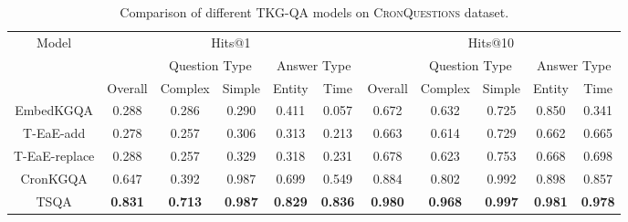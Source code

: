 \documentclass[11pt]{article}
\begin{document}
\begin{table*}[!ht]
    \centering
    \small
    \begin{tabular}{c||c|c|c|c|c||c|c|c|c|c}
      \hline
      \multirow{3}{4em}{Model}  &  \multicolumn{5}{c||}{Hits@1} &  \multicolumn{5}{c}{Hits@10}  \\ 
      \cline{2-11}
       &  & \multicolumn{2}{c|}{Question Type}& \multicolumn{2}{c||}{Answer Type} &  & \multicolumn{2}{c|}{Question Type}& \multicolumn{2}{c}{Answer Type}\\
      \cline{2-11}
       & Overall & Complex & Simple & Entity & Time & Overall & Complex & Simple & Entity & Time  \\ \hline 
      EmbedKGQA & 0.288 & 0.286 & 0.290 & 0.411 & 0.057 & 0.672 & 0.632 & 0.725 & 0.850 & 0.341 \\
      T-EaE-add & 0.278 &0.257& 0.306& 0.313& 0.213& 0.663& 0.614& 0.729& 0.662& 0.665 \\
      T-EaE-replace & 0.288 &0.257& 0.329& 0.318& 0.231& 0.678& 0.623& 0.753& 0.668& 0.698 \\
      CronKGQA & 0.647 & 0.392 & 0.987 & 0.699 & 0.549 & 0.884 & 0.802 & 0.992 & 0.898 & 0.857 \\
      \hline
      TSQA & \textbf{0.831} & \textbf{0.713} & \textbf{0.987} & \textbf{0.829} & \textbf{0.836} & \textbf{0.980} & \textbf{0.968} & \textbf{0.997} & \textbf{0.981} & \textbf{0.978} \\
      \hline
    \end{tabular} 
    \caption{Comparison of different TKG-QA models on \textsc{CronQuestions} dataset.}
    \label{ResultsTable2}
\end{table*}
\end{document}
